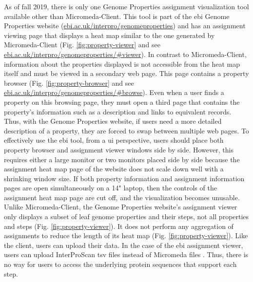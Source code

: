 As of fall 2019, there is only one Genome Properties assignment visualization tool available other than Micromeda-Client. This tool is part of the \gls{ebi}  Genome Properties website \cite{richardson2018genome} (\href{http://www.ebi.ac.uk/interpro/genomeproperties}{ebi.ac.uk/interpro/genomeproperties}) and has an assignment viewing page that displays a heat map similar to the one generated by Micromeda-Client \cite{richardson2018genome}  (Fig. \ref{fig:property-viewer} and see \href{http://www.ebi.ac.uk/interpro/genomeproperties/#viewer}{ebi.ac.uk/interpro/genomeproperties/\#viewer}). In contrast to Micromeda-Client, information about the properties displayed is not accessible from the heat map itself and must be viewed in a secondary web page. This page contains a property browser (Fig. \ref{fig:property-browser} and see \href{http://www.ebi.ac.uk/interpro/genomeproperties/#browse}{ebi.ac.uk/interpro/genomeproperties/\#browse}). Even when a user finds a property on this browsing page, they must open a third page that contains the property's information such as a description and links to equivalent records. Thus, with the Genome Properties website, if users need a more detailed description of a property, they are forced to swap between multiple web pages. To effectively use the \gls{ebi}  tool, from a \gls{ui}  perspective, users should place both property browser and assignment viewer windows side by side. However, this requires either a large monitor or two monitors placed side by side because the assignment heat map page of the website does not scale down well with a shrinking window size. If both property information and assignment information pages are open simultaneously on a 14" laptop, then the controls of the assignment heat map page are cut off, and the visualization becomes unusable. Unlike Micromeda-Client, the Genome Properties website's assignment viewer only displays a subset of leaf genome properties and their steps, not all properties and steps (Fig. \ref{fig:property-viewer}). It does not perform any aggregation of assignments to reduce the length of its heat map (Fig. \ref{fig:property-viewer}). Like the client, users can upload their data. In the case of the \gls{ebi}  assignment viewer, users can upload InterProScan \gls{tsv} files instead of Micromeda files \cite{richardson2018genome}. Thus, there is no way for users to access the underlying protein sequences that support each step.

